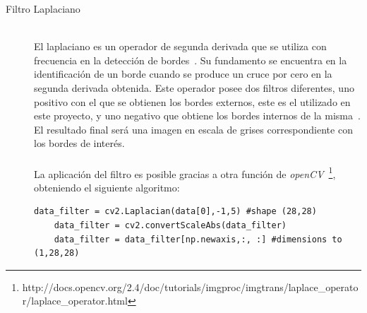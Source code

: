 \begin{description}
	\item[Filtro Laplaciano] \hfill 
	\vspace{5pt}
	\\
	El laplaciano es un operador de segunda derivada que se utiliza con frecuencia en la detección de bordes~\cite{laplacian}. Su fundamento se encuentra en la identificación de un borde cuando se produce un cruce por cero en la segunda derivada obtenida. Este operador posee dos filtros diferentes, uno positivo con el que se obtienen los bordes externos, este es el utilizado en este proyecto, y uno negativo que obtiene los bordes internos de la misma~\cite{laplacian2}. El resultado final será una imagen en escala de grises correspondiente con los bordes de interés.\\
	\vspace{-10pt}
	\\
	La aplicación del filtro es posible gracias a otra función de \textit{openCV}~\footnote{http://docs.opencv.org/2.4/doc/tutorials/imgproc/imgtrans/laplace\_operator/laplace\_operator.html}, obteniendo el siguiente algoritmo:
	\vspace{10pt}
	\begin{lstlisting}[frame=single]
	data_filter = cv2.Laplacian(data[0],-1,5) #shape (28,28)
	data_filter = cv2.convertScaleAbs(data_filter)
	data_filter = data_filter[np.newaxis,:, :] #dimensions to (1,28,28)
	\end{lstlisting}
	

\end{description}

